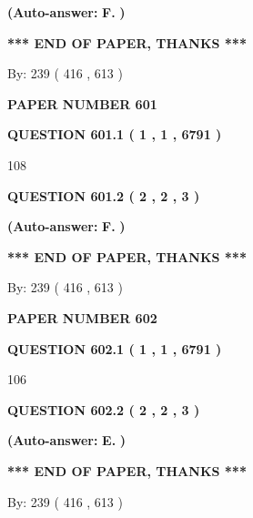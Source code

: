 \documentclass[12pt]{article}
\begin{document}
 
{\textbf{(Auto-answer:}}
{\textbf{\large{
F.}}}
{\textbf{)}}
 
 
   
   
   
   
\vspace{1.0in} 
{\textbf{\large{ *** END OF PAPER, THANKS *** }}} 
   
   
\hspace{1.0in} By: 
 239 ( 416 ,  613 )
   
   
   
   
\newpage 
\setcounter{page}{ 
   601001 } 
   
   
 {\textbf{ \Large{ PAPER NUMBER  601  }}}
   
   
   
   
  
  
{\textbf{\large{QUESTION
601.1 
 ( 1 , 1 , 6791 )
}}}

108
  
  
{\textbf{\large{QUESTION
601.2 
 ( 2 , 2 , 3 )
}}}
 
 
{\textbf{(Auto-answer:}}
{\textbf{\large{
F.}}}
{\textbf{)}}
 
 
   
   
   
   
\vspace{1.0in} 
{\textbf{\large{ *** END OF PAPER, THANKS *** }}} 
   
   
\hspace{1.0in} By: 
 239 ( 416 ,  613 )
   
   
   
   
\newpage 
\setcounter{page}{ 
   602001 } 
   
   
 {\textbf{ \Large{ PAPER NUMBER  602  }}}
   
   
   
   
  
  
{\textbf{\large{QUESTION
602.1 
 ( 1 , 1 , 6791 )
}}}

106
  
  
{\textbf{\large{QUESTION
602.2 
 ( 2 , 2 , 3 )
}}}
 
 
{\textbf{(Auto-answer:}}
{\textbf{\large{
E.}}}
{\textbf{)}}
 
 
   
   
   
   
\vspace{1.0in} 
{\textbf{\large{ *** END OF PAPER, THANKS *** }}} 
   
   
\hspace{1.0in} By: 
 239 ( 416 ,  613 )
   
   
   
\end{document}
